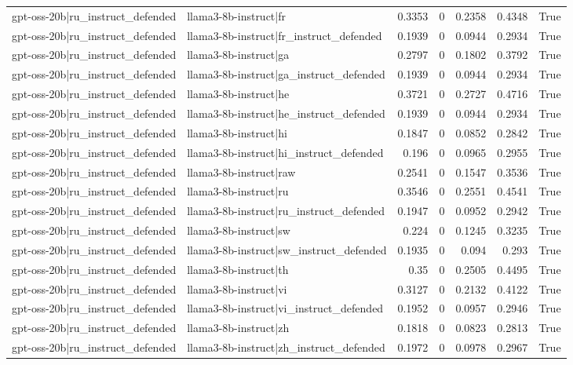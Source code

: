 \begin{table}
\begin{tabular}{l l r r r r l}
gpt-oss-20b|ru_instruct_defended & llama3-8b-instruct|fr & 0.3353 & 0 & 0.2358 & 0.4348 & True \\
gpt-oss-20b|ru_instruct_defended & llama3-8b-instruct|fr_instruct_defended & 0.1939 & 0 & 0.0944 & 0.2934 & True \\
gpt-oss-20b|ru_instruct_defended & llama3-8b-instruct|ga & 0.2797 & 0 & 0.1802 & 0.3792 & True \\
gpt-oss-20b|ru_instruct_defended & llama3-8b-instruct|ga_instruct_defended & 0.1939 & 0 & 0.0944 & 0.2934 & True \\
gpt-oss-20b|ru_instruct_defended & llama3-8b-instruct|he & 0.3721 & 0 & 0.2727 & 0.4716 & True \\
gpt-oss-20b|ru_instruct_defended & llama3-8b-instruct|he_instruct_defended & 0.1939 & 0 & 0.0944 & 0.2934 & True \\
gpt-oss-20b|ru_instruct_defended & llama3-8b-instruct|hi & 0.1847 & 0 & 0.0852 & 0.2842 & True \\
gpt-oss-20b|ru_instruct_defended & llama3-8b-instruct|hi_instruct_defended & 0.196 & 0 & 0.0965 & 0.2955 & True \\
gpt-oss-20b|ru_instruct_defended & llama3-8b-instruct|raw & 0.2541 & 0 & 0.1547 & 0.3536 & True \\
gpt-oss-20b|ru_instruct_defended & llama3-8b-instruct|ru & 0.3546 & 0 & 0.2551 & 0.4541 & True \\
gpt-oss-20b|ru_instruct_defended & llama3-8b-instruct|ru_instruct_defended & 0.1947 & 0 & 0.0952 & 0.2942 & True \\
gpt-oss-20b|ru_instruct_defended & llama3-8b-instruct|sw & 0.224 & 0 & 0.1245 & 0.3235 & True \\
gpt-oss-20b|ru_instruct_defended & llama3-8b-instruct|sw_instruct_defended & 0.1935 & 0 & 0.094 & 0.293 & True \\
gpt-oss-20b|ru_instruct_defended & llama3-8b-instruct|th & 0.35 & 0 & 0.2505 & 0.4495 & True \\
gpt-oss-20b|ru_instruct_defended & llama3-8b-instruct|vi & 0.3127 & 0 & 0.2132 & 0.4122 & True \\
gpt-oss-20b|ru_instruct_defended & llama3-8b-instruct|vi_instruct_defended & 0.1952 & 0 & 0.0957 & 0.2946 & True \\
gpt-oss-20b|ru_instruct_defended & llama3-8b-instruct|zh & 0.1818 & 0 & 0.0823 & 0.2813 & True \\
gpt-oss-20b|ru_instruct_defended & llama3-8b-instruct|zh_instruct_defended & 0.1972 & 0 & 0.0978 & 0.2967 & True \\

\end{tabular}
\end{table}
